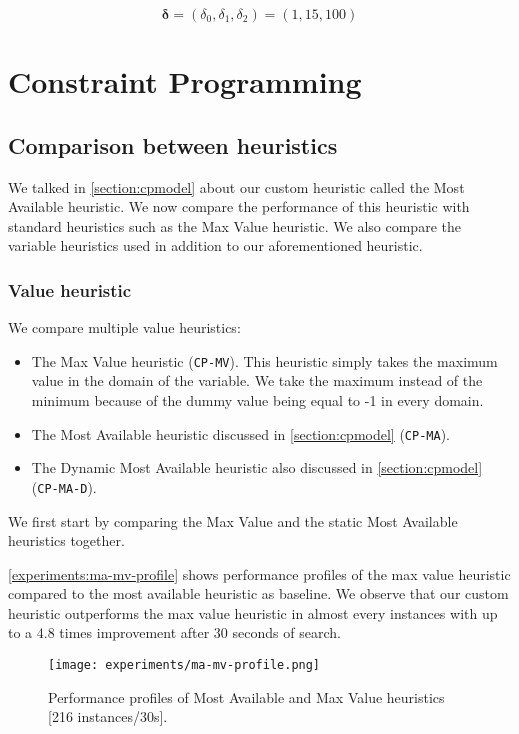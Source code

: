 \documentclass[../../thesis.tex]{subfiles}
\begin{document}
\begin{equation*}
  \bm{\delta} = (\delta_0, \delta_1, \delta_2) = (1, 15, 100)
\end{equation*}

\section{Constraint Programming}

\subsection{Comparison between heuristics}
\label{section:experiments:heuristics}

We talked in \autoref{section:cpmodel} about our custom heuristic called the Most Available heuristic.
We now compare the performance of this heuristic with standard heuristics such as the Max Value heuristic.
We also compare the variable heuristics used in addition to our aforementioned heuristic.

\subsubsection{Value heuristic}

We compare multiple value heuristics:

\begin{itemize}
  \item The Max Value heuristic (\texttt{CP-MV}). This heuristic simply takes the maximum value in the domain of the variable. We 
  take the maximum instead of the minimum because of the dummy value being equal to -1 in every domain. 
  \item The Most Available heuristic discussed in \autoref{section:cpmodel} (\texttt{CP-MA}).
  \item The Dynamic Most Available heuristic also discussed in \autoref{section:cpmodel} (\texttt{CP-MA-D}).
\end{itemize}

We first start by comparing the Max Value and the static Most Available heuristics together.

\autoref{experiments:ma-mv-profile} shows performance profiles of the max value heuristic compared to the most available heuristic 
as baseline. We observe that our custom heuristic outperforms the max value heuristic in almost every instances with 
up to a $4.8$ times improvement after 30 seconds of search.

\begin{figure}
  \centering
  \texttt{[image: experiments/ma-mv-profile.png]}
  \caption{Performance profiles of Most Available and Max Value heuristics [216 instances/30s].}
  \label{experiments:ma-mv-profile}
\end{figure}
\end{document}

